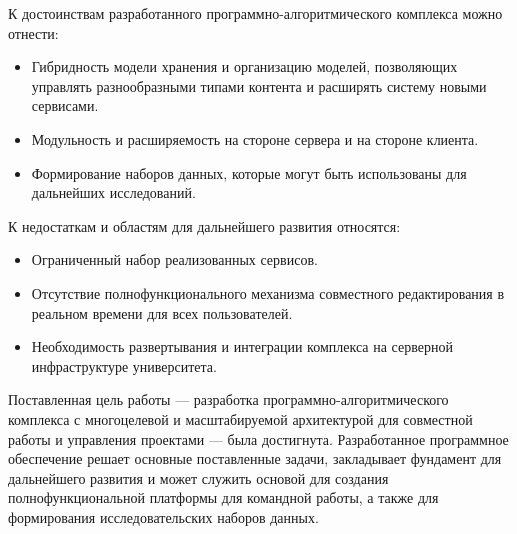 К достоинствам разработанного программно-алгоритмического комплекса можно отнести:
\begin{itemize}[wide=12.5mm, leftmargin=12.5mm]
    \item Гибридность модели хранения и организацию моделей, позволяющих управлять разнообразными типами контента и расширять систему новыми сервисами.
    \item Модульность и расширяемость на стороне сервера и на стороне клиента.
    \item Формирование наборов данных, которые могут быть использованы для дальнейших исследований.
\end{itemize}

К недостаткам и областям для дальнейшего развития относятся:
\begin{itemize}[wide=12.5mm, leftmargin=12.5mm]
    \item Ограниченный набор реализованных сервисов.
    \item Отсутствие полнофункционального механизма совместного редактирования в реальном времени для всех пользователей.
    \item Необходимость развертывания и интеграции комплекса на серверной инфраструктуре университета.
\end{itemize}

Поставленная цель работы --- разработка программно-алгоритмического комплекса с многоцелевой и масштабируемой архитектурой для совместной работы и управления проектами --- была достигнута. 
Разработанное программное обеспечение решает основные поставленные задачи, закладывает фундамент для дальнейшего развития и может служить основой для создания полнофункциональной платформы для командной работы, а также для формирования исследовательских наборов данных.
